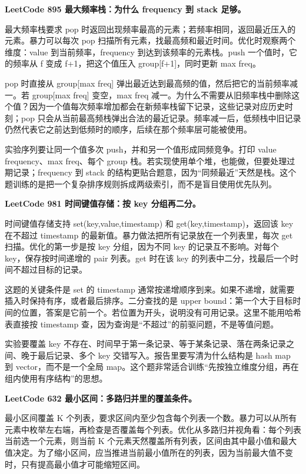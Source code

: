 \noindent\textbf{LeetCode 895 最大频率栈：为什么 frequency 到 stack 足够。}

最大频率栈要求 pop 时返回出现频率最高的元素；若频率相同，返回最近压入的元素。暴力可以每次 pop 扫描所有元素，找最高频和最近时间。优化时观察两个维度：value 到当前频率，frequency 到达到该频率的元素栈。push 一个值时，它的频率从 f 变成 f+1，把这个值压入 group[f+1]，同时更新 max freq。

pop 时直接从 group[max freq] 弹出最近达到最高频的值，然后把它的当前频率减一。若 group[max freq] 变空，max freq 减一。为什么不需要从旧频率栈中删除这个值？因为一个值每次频率增加都会在新频率栈留下记录，这些记录对应历史时刻；pop 只会从当前最高频栈弹出合法的最近记录。频率减一后，低频栈中旧记录仍然代表它之前达到低频时的顺序，后续在那个频率层可能被使用。

实验序列要让同一个值多次 push，并和另一个值形成同频竞争。打印 value frequency、max freq、每个 group 栈。若实现使用单个堆，也能做，但要处理过期记录；frequency 到 stack 的结构更贴合题意，因为“同频最近”天然是栈。这个题训练的是把一个复杂排序规则拆成两级索引，而不是盲目使用优先队列。

\noindent\textbf{LeetCode 981 时间键值存储：按 key 分组再二分。}

时间键值存储支持 set(key,value,timestamp) 和 get(key,timestamp)，返回该 key 在不超过 timestamp 的最新值。暴力做法把所有记录放在一个列表里，每次 get 扫描。优化的第一步是按 key 分组，因为不同 key 的记录互不影响。对每个 key，保存按时间递增的 pair 列表。get 时在该 key 的列表中二分，找最后一个时间不超过目标的记录。

这题的关键条件是 set 的 timestamp 通常按递增顺序到来。如果不递增，就需要插入时保持有序，或者最后排序。二分查找的是 upper bound：第一个大于目标时间的位置，答案是它前一个。若位置为开头，说明没有可用记录。这里不能用哈希表直接按 timestamp 查，因为查询是“不超过”的前驱问题，不是等值问题。

实验要覆盖 key 不存在、时间早于第一条记录、等于某条记录、落在两条记录之间、晚于最后记录、多个 key 交错写入。报告里要写清为什么结构是 hash map 到 vector，而不是一个全局 map。这个题非常适合训练“先按独立维度分组，再在组内使用有序结构”的思想。

\noindent\textbf{LeetCode 632 最小区间：多路归并里的覆盖条件。}

最小区间覆盖 K 个列表，要求区间内至少包含每个列表一个数。暴力可以从所有元素中枚举左右端，再检查是否覆盖每个列表。优化从多路归并视角看：每个列表当前选一个元素，则当前 K 个元素天然覆盖所有列表，区间由其中最小值和最大值决定。为了缩小区间，应当推进当前最小值所在的列表，因为当前最大值不变时，只有提高最小值才可能缩短区间。

